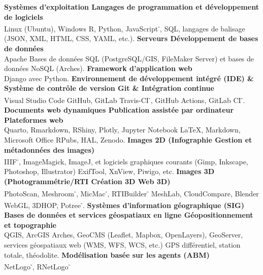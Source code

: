 \documentclass{article}
\begin{document}
\textbf{Systèmes d'exploitation {\textbar} Langages de programmation et développement de logiciels} \\
Linux (Ubuntu), Windows \textbf{{\textbar}} \textsf{R}, \textsf{Python}, \textsf{JavaScript\textsuperscript{-}}, SQL, langages de balisage (JSON, XML, HTML, CSS, YAML, etc.).
\smallbreak
\textbf{Serveurs {\textbar} Développement de bases de données} \\
Apache \textbf{{\textbar}} Bases de données SQL (PostgreSQL/GIS, FileMaker Server) et bases de données NoSQL (Arches).
\smallbreak
\textbf{Framework d'application web} \\
\textsf{Django} avec \textsf{Python}.
\smallbreak
\textbf{Environnement de développement intégré (IDE) \& Système de contrôle de version Git \& Intégration continue} \\
Visual Studio Code \textbf{{\textbar}} GitHub, GitLab \textbf{{\textbar}} Travis-CI\textsuperscript{-}, GitHub Actions, GitLab CI\textsuperscript{-}.
\smallbreak
\textbf{Documents web dynamiques {\textbar} Publication assistée par ordinateur {\textbar} Plateformes web} \\
\textsf{Quarto}, \textsf{Rmarkdown}, \textsf{RShiny}, \textsf{Plotly}, \textsf{Jupyter Notebook} \textbf{{\textbar}} \LaTeX, \textsf{Markdown}, Microsoft Office \textbf{{\textbar}} RPubs, HAL, Zenodo.
\smallbreak
\textbf{Images 2D (Infographie {\textbar} Gestion et métadonnées des images)} \\
IIIF\textsuperscript{-}, ImageMagick, ImageJ, et logiciels graphiques courants (Gimp, Inkscape, Photoshop, Illustrator) {\textbar} ExifTool, XnView, Piwigo, etc.
\smallbreak
\textbf{Images 3D (Photogrammétrie/RTI {\textbar} Création 3D {\textbar} Web 3D)} \\
PhotoScan, Meshroom\textsuperscript{-}, MicMac\textsuperscript{-}, RTIBuilder\textsuperscript{-} {\textbar} MeshLab, CloudCompare, Blender \textbf{{\textbar}} WebGL, 3DHOP, Potree\textsuperscript{-}.
\smallbreak
\textbf{Systèmes d'information géographique (SIG) {\textbar} Bases de données et services géospatiaux en ligne {\textbar} Géopositionnement et topographie} \\
QGIS, ArcGIS {\textbar} Arches, GeoCMS (\textsf{Leaflet}, \textsf{Mapbox}, \textsf{OpenLayers}), GeoServer, services géospatiaux web (WMS, WFS, WCS, etc.) {\textbar} GPS différentiel, station totale, théodolite.
\smallbreak
\textbf{Modélisation basée sur les agents (ABM)} \\ NetLogo\textsuperscript{-}, \textsf{RNetLogo\textsuperscript{-}}
\smallbreak
\end{document}
